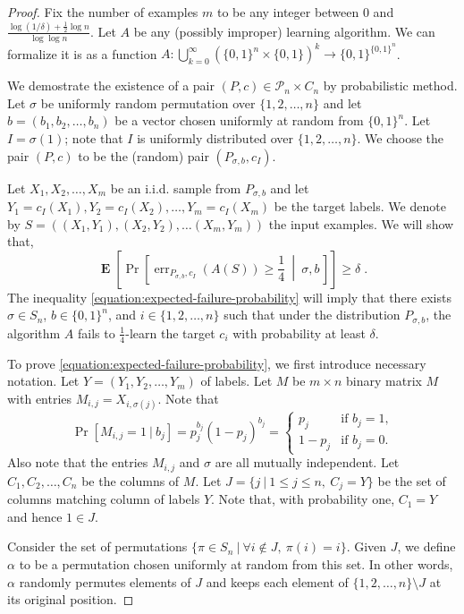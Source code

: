 \documentclass[12pt]{article}
\renewcommand{\P}{\mathcal{P}}
\DeclareMathOperator{\err}{err}
\DeclareMathOperator{\Exp}{\mathbf{E}}
\begin{document}
\begin{proof}
Fix the number of examples $m$ to be any integer between $0$ and
$\frac{\log(1/\delta) + \frac{1}{2} \log n}{\log \log n}$. Let $A$ be any
(possibly improper) learning algorithm. We can formalize it is as a function
$A:\bigcup_{k=0}^\infty (\{0,1\}^n \times \{0,1\})^k \to \{0,1\}^{\{0,1\}^n}$.

We demostrate the existence of a pair $(P,c) \in \P_n \times C_n$ by
probabilistic method. Let $\sigma$ be uniformly random permutation over
$\{1,2,\dots,n\}$ and let $b = (b_1, b_2, \dots, b_n)$ be a vector chosen
uniformly at random from $\{0,1\}^n$. Let $I = \sigma(1)$; note that $I$ is
uniformly distributed over $\{1,2,\dots,n\}$. We choose the pair $(P,c)$ to be
the (random) pair $(P_{\sigma,b},c_I)$.

Let $X_1, X_2, \dots, X_m$ be an i.i.d. sample from $P_{\sigma,b}$ and
let $Y_1 = c_I(X_1), Y_2 = c_I(X_2), \dots, Y_m = c_I(X_m)$ be the target labels.
We denote by $S = ((X_1, Y_1), (X_2, Y_2), \dots (X_m, Y_m))$ the input examples.
We will show that,
\begin{equation}
\label{equation:expected-failure-probability}
\Exp \left[ \Pr \left[\err_{P_{\sigma,b},c_I}(A(S)) \ge \frac{1}{4} \ \middle| \ \sigma, b \, \right] \right] \ge \delta \; .
\end{equation}
The inequality \eqref{equation:expected-failure-probability} will imply that
there exists $\sigma \in S_n$, $b \in \{0,1\}^n$, and $i \in
\{1,2,\dots,n\}$ such that under the distribution $P_{\sigma,b}$, the
algorithm $A$ fails to $\frac{1}{4}$-learn the target $c_i$ with probability at least $\delta$.

To prove \eqref{equation:expected-failure-probability}, we first introduce
necessary notation. Let $Y = (Y_1, Y_2, \dots, Y_m)$ of labels.
Let $M$ be $m \times n$ binary matrix $M$ with entries
$M_{i,j} = X_{i,\sigma(j)}$. Note that
$$
\Pr[M_{i,j} = 1 ~|~ b_j] =
p_j^{b_j} (1 - p_j)^{b_j} =
\begin{cases}
p_j & \text{if $b_j = 1$,} \\
1 - p_j & \text{if $b_j = 0$.}
\end{cases}
$$
Also note that the entries $M_{i,j}$ and $\sigma$ are all mutually independent.
Let $C_1, C_2, \dots, C_n$ be the columns of $M$. Let $J = \{ j ~|~ 1 \le j \le
n, \ C_j = Y \}$ be the set of columns matching column of labels $Y$. Note that,
with probability one, $C_1 = Y$ and hence $1 \in J$.

Consider the set of permutations $\{ \pi \in S_n ~|~ \forall i \not \in J, \
\pi(i) = i\}$. Given $J$, we define $\alpha$ to be a permutation chosen
uniformly at random from this set. In other words, $\alpha$ randomly permutes
elements of $J$ and keeps each element of $\{1,2,\dots,n\} \setminus J$ at its
original position.


\end{proof}
\end{document}
